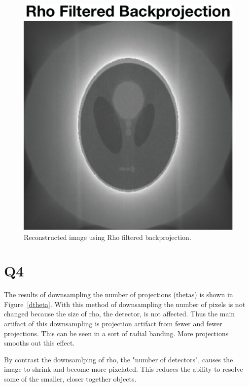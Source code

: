 \documentclass[12pt]{article}
\begin{document}
\begin{figure}[H]
	\includegraphics[width=\textwidth]{rhoFilt.png}
	\caption{Reconstructed image using Rho filtered backprojection.}
	\label{rho}
\end{figure}

\section{Q4}
The results of downsampling the number of projections (thetas) is shown in Figure~\ref{dtheta}. With this method of downsampling the number of pixels is not changed because the size of rho, the detector, is not affected. Thus the main artifact of this downsampling is projection artifact from fewer and fewer projections. This can be seen in a  sort of radial banding. More projections smooths out this effect.

By contrast the downsamlping of rho, the "number of detectors", causes the image to shrink and become more pixelated. This reduces the ability to resolve some of the smaller, closer together objects.
\end{document}
